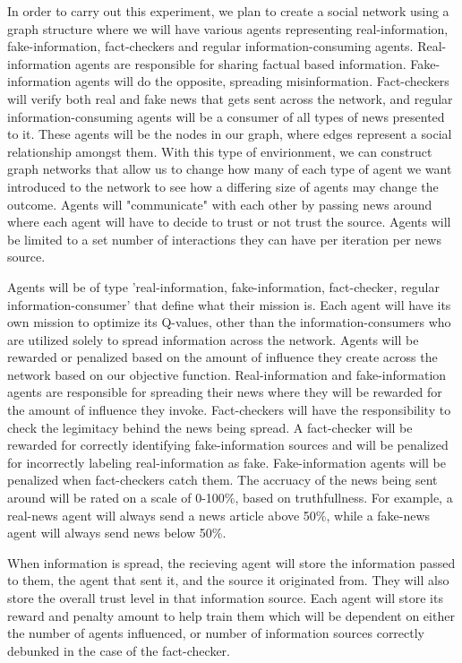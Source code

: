 \documentclass[12pt,twoside]{article}
\begin{document}
In order to carry out this experiment, we plan to create a social network using a graph structure where we will have various agents representing real-information, fake-information, fact-checkers and regular information-consuming agents. Real-information agents are responsible for sharing factual based information. Fake-information agents will do the opposite, spreading misinformation. Fact-checkers will verify both real and fake news that gets sent across the network, and regular information-consuming agents will be a consumer of all types of news presented to it. These agents will be the nodes in our graph, where edges represent a social relationship amongst them. With this type of envirionment, we can construct graph networks that allow us to change how many of each type of agent we want introduced to the network to see how a differing size of agents may change the outcome. Agents will "communicate" with each other by passing news around where each agent will have to decide to trust or not trust the source. Agents will be limited to a set number of interactions they can have per iteration per news source.

Agents will be of type 'real-information, fake-information, fact-checker, regular information-consumer' that define what their mission is. Each agent will have its own mission to optimize its Q-values, other than the information-consumers who are utilized solely to spread information across the network. Agents will be rewarded or penalized based on the amount of influence they create across the network based on our objective function. Real-information and fake-information agents are responsible for spreading their news where they will be rewarded for the amount of influence they invoke. Fact-checkers will have the responsibility to check the legimitacy behind the news being spread. A fact-checker will be rewarded for correctly identifying fake-information sources and will be penalized for incorrectly labeling real-information as fake. Fake-information agents will be penalized when fact-checkers catch them. The accruacy of the news being sent around will be rated on a scale of 0-100\%, based on truthfullness. For example, a real-news agent will always send a news article above 50\%, while a fake-news agent will always send news below 50\%.

When information is spread, the recieving agent will store the information passed to them, the agent that sent it, and the source it originated from. They will also store the overall trust level in that information source. Each agent will store its reward and penalty amount to help train them which will be dependent on either the number of agents influenced, or number of information sources correctly debunked in the case of the fact-checker.
\end{document}
